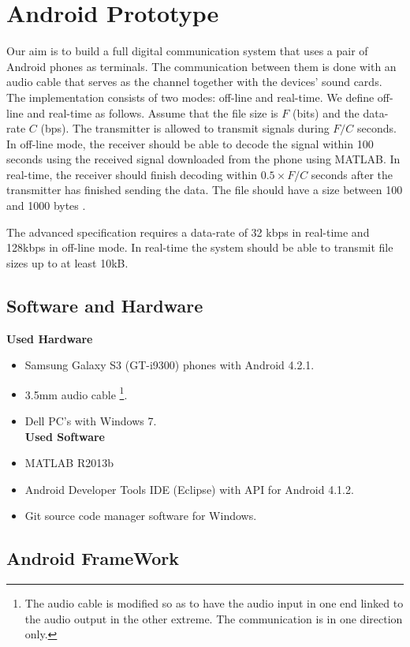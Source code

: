 \documentclass[12pt,a4paper,openright]{report}
\begin{document}
\chapter{Android Prototype}
\label{chap:App}
Our aim is to build a full digital communication system that uses a pair of Android phones as terminals. The communication between them is done with an audio cable that serves as the channel together with the devices' sound cards. The implementation consists of two modes: off-line and real-time. We define off-line and real-time as follows. Assume that the file size is $F$ (bits) and the data-rate $C$ (bps). The transmitter is allowed to transmit signals during $F/C$ seconds. In off-line mode, the receiver should be able to decode the signal within 100 seconds using the received signal downloaded from the phone using MATLAB. In real-time, the receiver should finish decoding within $0.5\times F/C$ seconds after the transmitter has finished sending the data. The file should have a size between 100 and 1000 bytes \cite{EQ2440ProjectDescription}.

The advanced specification requires a data-rate of 32 kbps in real-time and 128kbps in off-line mode. In real-time the system should be able to transmit file sizes up to at least 10kB.


\section{Software and Hardware}


\textbf{Used Hardware}
\begin{itemize}
\item Samsung Galaxy S3 (GT-i9300) phones with Android 4.2.1.
\item 3.5mm audio cable {\color{Black}\footnote{The audio cable is modified so as to have the audio input in one end linked to the audio output in the other extreme. The communication is in one direction only.}}.
\item Dell PC's with Windows 7.
\\

\textbf{Used Software}
\item MATLAB R2013b 
\item Android Developer Tools IDE (Eclipse) with  API for Android 4.1.2. 
\item Git source code manager software for Windows.

\end{itemize}


\section{Android FrameWork}
\end{document}
